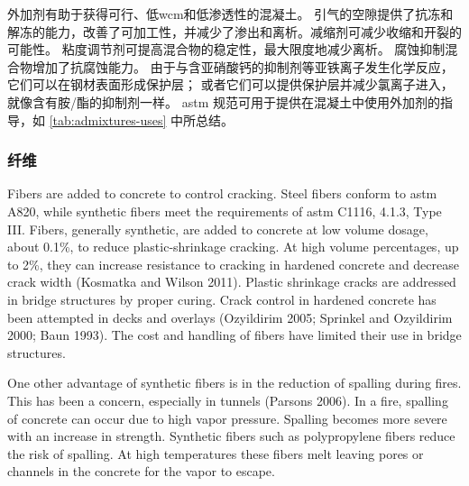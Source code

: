 外加剂有助于获得可行、低\acrlong*{wcm}和低渗透性的混凝土。 引气的空隙提供了抗冻和解冻的能力，改善了可加工性，并减少了渗出和离析。减缩剂可减少收缩和开裂的可能性。 粘度调节剂可提高混合物的稳定性，最大限度地减少离析。 腐蚀抑制混合物增加了抗腐蚀能力。 由于与含亚硝酸钙的抑制剂等亚铁离子发生化学反应，它们可以在钢材表面形成保护层； 或者它们可以提供保护层并减少氯离子进入，就像含有胺/酯的抑制剂一样。 \acrshort*{astm} 规范可用于提供在混凝土中使用外加剂的指导，如 \cref{tab:admixtures-uses} 中所总结。

\subsubsection{纤维}
Fibers are added to concrete to control cracking. Steel fibers conform to \acrshort*{astm} A820, while synthetic fibers meet the requirements of \acrshort*{astm} C1116, 4.1.3, Type III. Fibers, generally synthetic, are added to concrete at low volume dosage, about 0.1\%, to reduce plastic-shrinkage cracking. At high volume percentages, up to 2\%, they can increase resistance to cracking in hardened concrete and decrease crack width (Kosmatka and Wilson 2011). Plastic shrinkage cracks are addressed in bridge structures by proper curing. Crack control in hardened concrete has been attempted in decks and overlays (Ozyildirim 2005; Sprinkel and Ozyildirim 2000; Baun 1993). The cost and handling of fibers have limited their use in bridge structures.

One other advantage of synthetic fibers is in the reduction of spalling during fires. This has been a concern, especially in tunnels (Parsons 2006). In a fire, spalling of concrete can occur due to high vapor pressure. Spalling becomes more severe with an increase in strength. Synthetic fibers such as polypropylene fibers reduce the risk of spalling. At high temperatures these fibers melt leaving pores or channels in the concrete for the vapor to escape.

